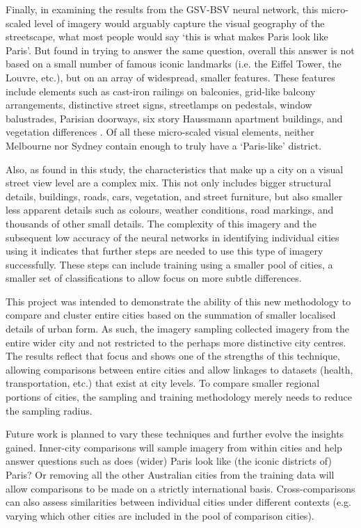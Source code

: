 \documentclass[Crown,sageh,times]{sagej}
\begin{document}
Finally, in examining the results from the GSV-BSV neural network, this micro-scaled level of imagery would arguably capture the visual geography of the streetscape, what most people would say `this is what makes Paris look like Paris'. But \citet{Doersch2012} found in trying to answer the same question, overall this answer is not based on a small number of famous iconic landmarks (i.e. the Eiffel Tower, the Louvre, etc.), but on an array of widespread, smaller features. These features include elements such as cast-iron railings on balconies, grid-like balcony arrangements, distinctive street signs, streetlamps on pedestals, window balustrades, Parisian doorways, six story Haussmann apartment buildings, and vegetation differences \citep{Li2015}. Of all these micro-scaled visual elements, neither Melbourne nor Sydney contain enough to truly have a `Paris-like' district.

Also, as found in this study, the characteristics that make up a city on a visual street view level are a complex mix. This not only includes bigger structural details, buildings, roads, cars, vegetation, and street furniture, but also smaller less apparent details such as colours, weather conditions, road markings, and thousands of other small details. The complexity of this imagery and the subsequent low accuracy of the neural networks in identifying individual cities using it indicates that further steps are needed to use this type of imagery successfully. These steps can include training using a smaller pool of cities, a smaller set of classifications to allow focus on more subtle differences.

This project was intended to demonstrate the ability of this new methodology to compare and cluster entire cities based on the summation of smaller localised details of urban form. As such, the imagery sampling collected imagery from the entire wider city and not restricted to the perhaps more distinctive city centres. The results reflect that focus and shows one of the strengths of this technique, allowing comparisons between entire cities and allow linkages to datasets (health, transportation, etc.) that exist at city levels. To compare smaller regional portions of cities, the sampling and training methodology merely needs to reduce the sampling radius.

Future work is planned to vary these techniques and further evolve the insights gained. Inner-city comparisons will sample imagery from within cities and help answer questions such as does (wider) Paris look like (the iconic districts of) Paris? Or removing all the other Australian cities from the training data will allow comparisons to be made on a strictly international basis. Cross-comparisons can also assess similarities between individual cities under different contexts (e.g. varying which other cities are included in the pool of comparison cities). 
\end{document}
